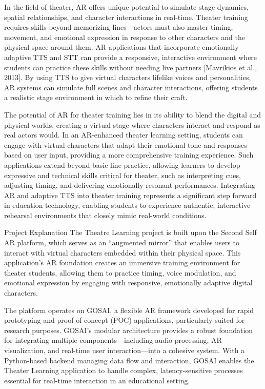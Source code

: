 In the field of theater, AR offers unique potential to simulate stage dynamics, spatial relationships, and character interactions in real-time. Theater training requires skills beyond memorizing lines—actors must also master timing, movement, and emotional expression in response to other characters and the physical space around them. AR applications that incorporate emotionally adaptive TTS and STT can provide a responsive, interactive environment where students can practice these skills without needing live partners [Mavrikios et al., 2013]. By using TTS to give virtual characters lifelike voices and personalities, AR systems can simulate full scenes and character interactions, offering students a realistic stage environment in which to refine their craft.

The potential of AR for theater training lies in its ability to blend the digital and physical worlds, creating a virtual stage where characters interact and respond as real actors would. In an AR-enhanced theater learning setting, students can engage with virtual characters that adapt their emotional tone and responses based on user input, providing a more comprehensive training experience. Such applications extend beyond basic line practice, allowing learners to develop expressive and technical skills critical for theater, such as interpreting cues, adjusting timing, and delivering emotionally resonant performances. Integrating AR and adaptive TTS into theater training represents a significant step forward in education technology, enabling students to experience authentic, interactive rehearsal environments that closely mimic real-world conditions.

Project Explanation
The Theatre Learning project is built upon the Second Self AR platform, which serves as an “augmented mirror” that enables users to interact with virtual characters embedded within their physical space. This application’s AR foundation creates an immersive training environment for theater students, allowing them to practice timing, voice modulation, and emotional expression by engaging with responsive, emotionally adaptive digital characters.

The platform operates on GOSAI, a flexible AR framework developed for rapid prototyping and proof-of-concept (POC) applications, particularly suited for research purposes. GOSAI’s modular architecture provides a robust foundation for integrating multiple components—including audio processing, AR visualization, and real-time user interaction—into a cohesive system. With a Python-based backend managing data flow and interaction, GOSAI enables the Theater Learning application to handle complex, latency-sensitive processes essential for real-time interaction in an educational setting.

